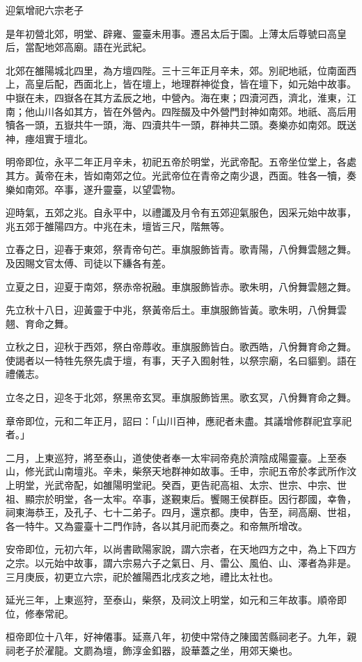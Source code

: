 
\begin{pinyinscope}
迎氣增祀六宗老子

是年初營北郊，明堂、辟雍、靈臺未用事。遷呂太后于園。上薄太后尊號曰高皇后，當配地郊高廟。語在光武紀。

北郊在雒陽城北四里，為方壇四陛。三十三年正月辛未，郊。別祀地祇，位南面西上，高皇后配，西面北上，皆在壇上，地理群神從食，皆在壇下，如元始中故事。中嶽在未，四嶽各在其方孟辰之地，中營內。海在東；四瀆河西，濟北，淮東，江南；他山川各如其方，皆在外營內。四陛醊及中外營門封神如南郊。地祇、高后用犢各一頭，五嶽共牛一頭，海、四瀆共牛一頭，群神共二頭。奏樂亦如南郊。既送神，瘞俎實于壇北。

明帝即位，永平二年正月辛未，初祀五帝於明堂，光武帝配。五帝坐位堂上，各處其方。黃帝在未，皆如南郊之位。光武帝位在青帝之南少退，西面。牲各一犢，奏樂如南郊。卒事，遂升靈臺，以望雲物。

迎時氣，五郊之兆。自永平中，以禮讖及月令有五郊迎氣服色，因采元始中故事，兆五郊于雒陽四方。中兆在未，壇皆三尺，階無等。

立春之日，迎春于東郊，祭青帝句芒。車旗服飾皆青。歌青陽，八佾舞雲翹之舞。及因賜文官太傅、司徒以下縑各有差。

立夏之日，迎夏于南郊，祭赤帝祝融。車旗服飾皆赤。歌朱明，八佾舞雲翹之舞。

先立秋十八日，迎黃靈于中兆，祭黃帝后土。車旗服飾皆黃。歌朱明，八佾舞雲翹、育命之舞。

立秋之日，迎秋于西郊，祭白帝蓐收。車旗服飾皆白。歌西皓，八佾舞育命之舞。使謁者以一特牲先祭先虞于壇，有事，天子入囿射牲，以祭宗廟，名曰貙劉。語在禮儀志。

立冬之日，迎冬于北郊，祭黑帝玄冥。車旗服飾皆黑。歌玄冥，八佾舞育命之舞。

章帝即位，元和二年正月，詔曰：「山川百神，應祀者未盡。其議增修群祀宜享祀者。」

二月，上東巡狩，將至泰山，道使使者奉一太牢祠帝堯於濟陰成陽靈臺。上至泰山，修光武山南壇兆。辛未，柴祭天地群神如故事。壬申，宗祀五帝於孝武所作汶上明堂，光武帝配，如雒陽明堂祀。癸酉，更告祀高祖、太宗、世宗、中宗、世祖、顯宗於明堂，各一太牢。卒事，遂覲東后。饗賜王侯群臣。因行郡國，幸魯，祠東海恭王，及孔子、七十二弟子。四月，還京都。庚申，告至，祠高廟、世祖，各一特牛。又為靈臺十二門作詩，各以其月祀而奏之。和帝無所增改。

安帝即位，元初六年，以尚書歐陽家說，謂六宗者，在天地四方之中，為上下四方之宗。以元始中故事，謂六宗易六子之氣日、月、雷公、風伯、山、澤者為非是。三月庚辰，初更立六宗，祀於雒陽西北戌亥之地，禮比太社也。

延光三年，上東巡狩，至泰山，柴祭，及祠汶上明堂，如元和三年故事。順帝即位，修奉常祀。

桓帝即位十八年，好神僊事。延熹八年，初使中常侍之陳國苦縣祠老子。九年，親祠老子於濯龍。文罽為壇，飾淳金釦器，設華蓋之坐，用郊天樂也。


\end{pinyinscope}